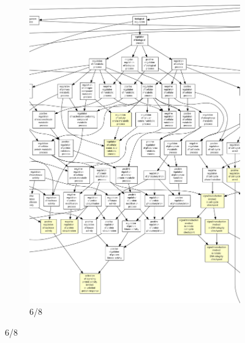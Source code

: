 \begin{figure}[p]
\ContinuedFloat
\begin{subfigure}{\textwidth}
\includegraphics[width=\textwidth]
{Figures/hlc-go-all-graph/hlc-go-all-graph_5.png}
\caption{6/8}
\end{subfigure}
\end{figure}

